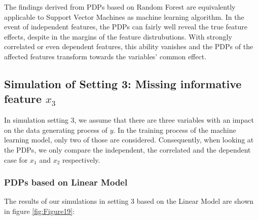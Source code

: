 \documentclass[]{krantz}
\begin{document}
The findings derived from PDPs based on Random Forest are equivalently
applicable to Support Vector Machines as machine learning algorithm. In
the event of independent features, the PDPs can fairly well reveal the
true feature effects, despite in the margins of the feature
distrubutions. With strongly correlated or even dependent features, this
ability vanishes and the PDPs of the affected features transform towards
the variables' common effect.

\subsection{\texorpdfstring{Simulation of Setting 3: Missing informative
feature
\(x_3\)}{Simulation of Setting 3: Missing informative feature x\_3}}\label{simulation-of-setting-3-missing-informative-feature-x_3}

In simulation setting 3, we assume that there are three variables with
an impact on the data generating process of \(y\). In the training
process of the machine learning model, only two of those are considered.
Consequently, when looking at the PDPs, we only compare the independent,
the correlated and the dependent case for \(x_1\) and \(x_2\)
respectively.

\subsubsection{PDPs based on Linear
Model}\label{pdps-based-on-linear-model-1}

The results of our simulations in setting 3 based on the Linear Model
are shown in figure \ref{fig:Figure19}:
\end{document}
